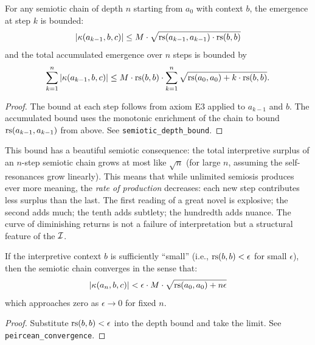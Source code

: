 \begin{theorem}
\label{thm:semiotic-depth-bound}
For any semiotic chain of depth $n$ starting from $a_0$ with
context $b$, the emergence at step $k$ is bounded:
\[
  |\kappa(a_{k-1}, b, c)| \leq M \cdot
  \sqrt{\mathrm{rs}(a_{k-1}, a_{k-1}) \cdot \mathrm{rs}(b, b)}
\]
and the total accumulated emergence over $n$ steps is bounded by
\[
  \sum_{k=1}^{n} |\kappa(a_{k-1}, b, c)| \leq
  M \cdot \mathrm{rs}(b, b) \cdot \sum_{k=1}^{n}
  \sqrt{\mathrm{rs}(a_0, a_0) + k \cdot \mathrm{rs}(b, b)}.
\]
\end{theorem}

\begin{proof}
The bound at each step follows from axiom E3 applied to $a_{k-1}$
and $b$. The accumulated bound uses the monotonic enrichment of the
chain to bound $\mathrm{rs}(a_{k-1}, a_{k-1})$ from above. See
\texttt{semiotic\_depth\_bound}.
\end{proof}

\begin{interpretation}
This bound has a beautiful semiotic consequence: the total interpretive
surplus of an $n$-step semiotic chain grows at most like $\sqrt{n}$
(for large $n$, assuming the self-resonances grow linearly). This
means that while unlimited semiosis produces ever more meaning, the
\emph{rate of production} decreases: each new step contributes less
surplus than the last. The first reading of a great novel is
explosive; the second adds much; the tenth adds subtlety; the
hundredth adds nuance. The curve of diminishing returns is not a
failure of interpretation but a structural feature of the $\mathcal{I}$.
\end{interpretation}

\begin{theorem}
\label{thm:peircean-convergence}
If the interpretive context $b$ is sufficiently ``small'' (i.e.,
$\mathrm{rs}(b, b) < \epsilon$ for small $\epsilon$), then the semiotic
chain converges in the sense that:
\[
  |\kappa(a_n, b, c)| < \epsilon \cdot M \cdot
  \sqrt{\mathrm{rs}(a_0, a_0) + n\epsilon}
\]
which approaches zero as $\epsilon \to 0$ for fixed $n$.
\end{theorem}

\begin{proof}
Substitute $\mathrm{rs}(b, b) < \epsilon$ into the depth bound and take
the limit. See \texttt{peircean\_convergence}.
\end{proof}

